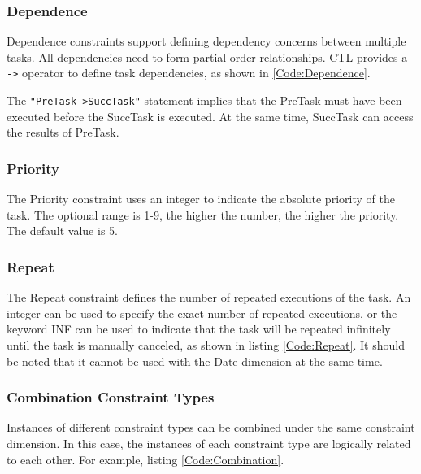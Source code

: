 

\subsubsection{Dependence}
Dependence constraints support defining dependency concerns between multiple tasks. All dependencies need to form partial order relationships. CTL provides a \texttt{->} operator to define task dependencies, as shown in \ref{Code:Dependence}.



The \texttt{"PreTask->SuccTask"} statement implies that the PreTask must have been executed before the SuccTask is executed. At the same time, SuccTask can access the results of PreTask.

\subsubsection{Priority}
The Priority constraint uses an integer to indicate the absolute priority of the task. The optional range is 1-9, the higher the number, the higher the priority. The default value is 5.
\subsubsection{Repeat}
The Repeat constraint defines the number of repeated executions of the task. An integer can be used to specify the exact number of repeated executions, or the keyword INF can be used to indicate that the task will be repeated infinitely until the task is manually canceled, as shown in listing \ref{Code:Repeat}. It should be noted that it cannot be used with the Date dimension at the same time.




\subsubsection{Combination Constraint Types}
Instances of different constraint types can be combined under the same constraint dimension. In this case, the instances of each constraint type are logically related to each other. For example, listing \ref{Code:Combination}.

